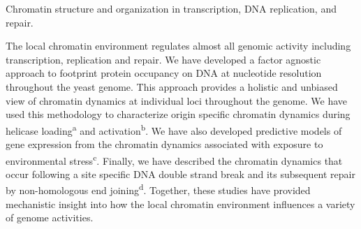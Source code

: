 
\item Chromatin structure and organization in transcription, DNA replication, and repair.   

The local chromatin environment regulates almost all genomic activity including transcription, replication and repair.  We have developed a factor agnostic approach to footprint  protein occupancy on DNA at nucleotide resolution throughout the yeast genome.  This approach provides a holistic and unbiased view of chromatin dynamics at individual loci throughout the genome.  We have used this methodology to characterize origin specific chromatin dynamics during helicase loading\textsuperscript{a} and activation\textsuperscript{b}. We have also developed predictive models of gene expression from the chromatin dynamics associated with exposure to environmental stress\textsuperscript{c}. Finally, we have described the chromatin dynamics that occur following a site specific DNA double strand break and its subsequent repair by non-homologous end joining\textsuperscript{d}.  Together, these studies have provided mechanistic insight into how the local chromatin environment influences a variety of genome activities.  


